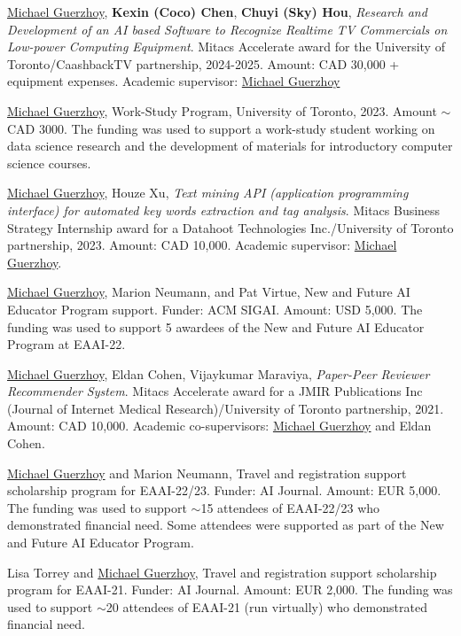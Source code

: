 \documentclass[letterpaper,11pt]{article}
\begin{document}
\begin{revnumerate}
	\item \underline{Michael Guerzhoy}, \textbf{Kexin (Coco) Chen}, \textbf{Chuyi (Sky) Hou}, \textit{Research and Development of an AI based Software to Recognize Realtime TV Commercials on Low-power Computing Equipment}. Mitacs Accelerate award for the University of Toronto/CaashbackTV partnership, 2024-2025. Amount: CAD 30,000 + equipment expenses. Academic supervisor: \underline{Michael Guerzhoy}
	
	\item \underline{Michael Guerzhoy}, Work-Study Program, University of Toronto, 2023. Amount $\sim$CAD 3000. The funding was used to support a work-study student working on data science research and the development of materials for introductory computer science courses.

	

	\item \underline{Michael Guerzhoy}, Houze Xu, \textit{Text mining API (application programming interface) for automated key words extraction and tag analysis}. Mitacs Business Strategy Internship award for a Datahoot Technologies Inc./University of Toronto partnership, 2023. Amount: CAD 10,000. Academic supervisor: \underline{Michael Guerzhoy}. 

	\item \underline{Michael Guerzhoy}, Marion Neumann, and Pat Virtue, New and Future AI Educator Program support. Funder: ACM SIGAI. Amount: USD 5,000. The funding was used to support 5 awardees of the New and Future AI Educator Program at EAAI-22.

	\item \underline{Michael Guerzhoy}, Eldan Cohen, Vijaykumar Maraviya, \textit{Paper-Peer Reviewer Recommender System}. Mitacs Accelerate award for a JMIR Publications Inc (Journal of Internet Medical Research)/University of Toronto partnership, 2021. Amount: CAD 10,000. Academic co-supervisors: \underline{Michael Guerzhoy} and Eldan Cohen.


	\item \underline{Michael Guerzhoy} and Marion Neumann, Travel and registration support scholarship program for EAAI-22/23. Funder: AI Journal. Amount: EUR 5,000. The funding was used to support $\sim$15 attendees of EAAI-22/23  who demonstrated financial need. Some attendees were supported as part of the New and Future AI Educator Program.


	\item Lisa Torrey and \underline{Michael Guerzhoy}, Travel and registration support scholarship program for EAAI-21. Funder: AI Journal. Amount: EUR 2,000. The funding was used to support $\sim$20 attendees of EAAI-21 (run virtually) who demonstrated financial need. 






\end{revnumerate}
\end{document}
